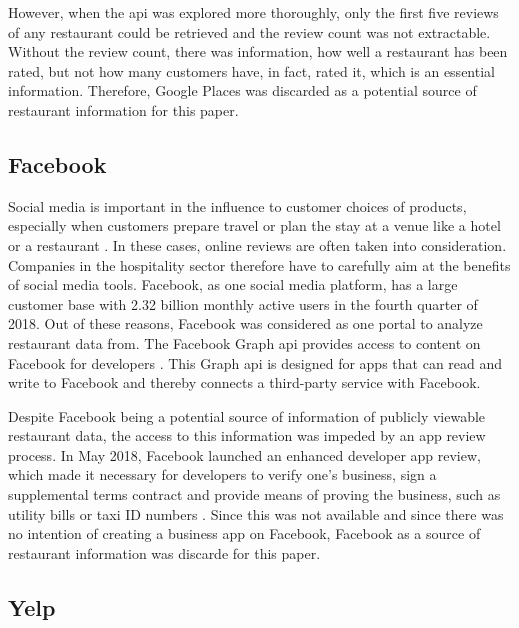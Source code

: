 \documentclass[a4paper, 11pt, oneside]{Thesis}  %
\begin{document}
However, when the \ac{api} was explored more thoroughly, only the first five reviews of any restaurant could be retrieved and the review count was not extractable. Without the review count, there was information, how well a restaurant has been rated, but not how many customers have, in fact, rated it, which is an essential information. Therefore, Google Places was discarded as a potential source of restaurant information for this paper.

\subsection{Facebook}

Social media is important in the influence to customer choices of products, especially when customers prepare travel or plan the stay at a venue like a hotel or a restaurant \cite{Kwok.2013}. In these cases, online reviews are often taken into consideration. Companies in the hospitality sector therefore have to carefully aim at the benefits of social media tools. Facebook, as one social media platform, has a large customer base with 2.32 billion monthly active users in the fourth quarter of 2018\cite{statista.facebook.2019}. Out of these reasons, Facebook was considered as one portal to analyze restaurant data from. The Facebook Graph \ac{api} provides access to content on Facebook for developers \cite{facebook.graph.2019}. This Graph \ac{api} is designed for apps that can read and write to Facebook and thereby connects a third-party service with Facebook.

Despite Facebook being a potential source of information of publicly viewable restaurant data, the access to this information was impeded by an app review process. In May 2018, Facebook launched an enhanced developer app review, which made it necessary for developers to verify one's business, sign a supplemental terms contract and provide means of proving the business, such as utility bills or taxi ID numbers \cite{KonstantinosPapamiltiadis.01.05.2018}. Since this was not available and since there was no intention of creating a business app on Facebook, Facebook as a source of restaurant information was discarde for this paper.

\subsection{Yelp}
\end{document}
